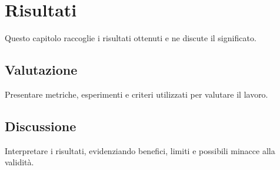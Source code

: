 \chapter{Risultati}
\label{chap:results}

Questo capitolo raccoglie i risultati ottenuti e ne discute il significato.

\section{Valutazione}

Presentare metriche, esperimenti e criteri utilizzati per valutare il lavoro.

\section{Discussione}

Interpretare i risultati, evidenziando benefici, limiti e possibili minacce
alla validità.
